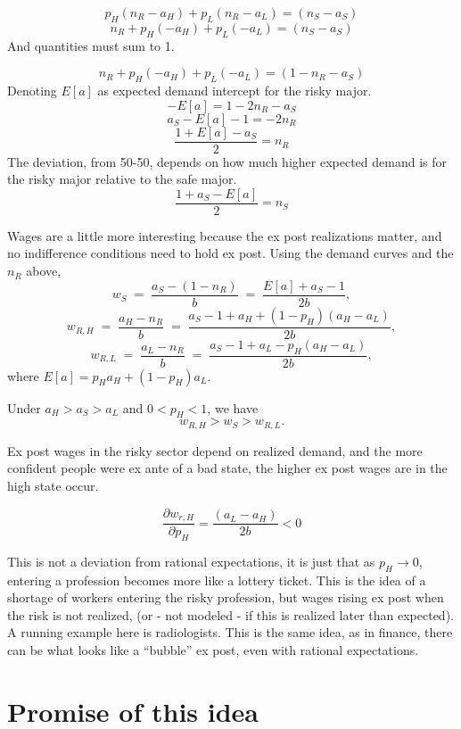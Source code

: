\documentclass[12pt]{article}
\begin{document}
$$ p_H(n_R - a_H)  + p_L(n_R - a_L) =(n_S-a_S)   $$
$$n_R + p_H(-a_H)  + p_L(- a_L) =(n_S-a_S)   $$
And quantities must sum to 1. 

$$n_R + p_H(-a_H)  + p_L(- a_L) =(1-n_R-a_S)   $$
Denoting $E[a]$ as expected demand intercept for the risky major.
$$ -E[a]= 1-2 n_R - a_S  $$
$$ a_S -E[a] - 1= -2 n_R   $$
$$  \frac{1 + E[a] - a_S}{2}  = n_R   $$
The deviation, from 50-50, depends on how much higher expected demand is for the risky major relative to the safe major.
$$ \frac{1  + a_S  - E[a]}{2} = n_S   $$ 


Wages are a little more interesting because the ex post realizations matter, and no indifference conditions need to hold ex post. Using the demand curves and the $n_R$ above,
\[
w_S \;=\; \frac{a_S - (1-n_R)}{b}
      \;=\; \frac{E[a] + a_S - 1}{2b},
\]
\[
w_{R,H} \;=\; \frac{a_H - n_R}{b}
           \;=\; \frac{a_S - 1 + a_H + (1-p_H)(a_H - a_L)}{2b},
\]
\[
w_{R,L} \;=\; \frac{a_L - n_R}{b}
           \;=\; \frac{a_S - 1 + a_L - p_H(a_H - a_L)}{2b},
\]
where $E[a] = p_H a_H + (1-p_H)a_L$.

Under $a_H > a_S > a_L$ and $0 < p_H < 1$, we have
\[
w_{R,H} > w_S > w_{R,L}.
\]




Ex post wages in the risky sector depend on realized demand, and the more confident people were ex ante of a bad state,  the higher ex post wages are in the high state occur.

$$\frac{\partial w_{r,H}}{\partial p_H} = \frac{(a_L - a_H)}{2b} < 0$$

 This is not a deviation from rational expectations, it is just that as $p_H \to 0$, entering a profession becomes more like a lottery ticket. This is the idea of a shortage of workers entering the risky profession, but wages rising ex post when the risk is not realized, (or - not modeled - if this is realized later than expected).  A running example here is radiologists.  This is the same idea, as in finance, there can be what looks like a ``bubble'' ex post, even with rational expectations.


\section{Promise of this idea}
\end{document}
